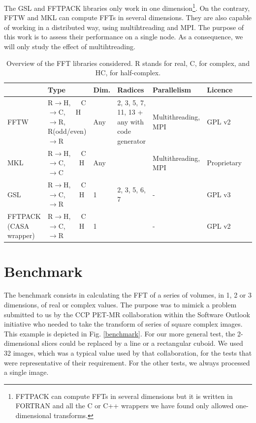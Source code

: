 \documentclass[12pt, a4paper]{article}
\begin{document}
The GSL and FFTPACK libraries only work in one dimension\footnote{FFTPACK can compute FFTs in several dimensions but it is written in FORTRAN and all the C or C++ wrappers we have found only allowed one-dimensional transforms.}. On the contrary, FFTW and MKL can compute FFTs in several dimensions. They are also capable of working in a distributed way, using multihtreading and MPI. The purpose of this work is to assess their performance on a single node. As a consequence, we will only study the effect of multihtreading. 
\begin{table}[H]
\captionsetup{width=1\textwidth}
\begin{tabular}{|p{2.5cm}||p{2.5cm}|p{1cm}|p{3cm}|p{3cm}|p{2cm}|p{2cm}|}
\hline
& Type & Dim. & Radices & Parallelism & Licence \\
\hline
\hline
FFTW & R$\to$H,\ \ \  C$\to$C,\ \ \  H$\to$R, R{\scriptsize (odd/even)}$\to$R& Any&2, 3, 5, 7, 11, 13 + any with code generator & Multithreading, MPI & GPL v2\\
\hline
MKL  &  R$\to$H,\ \ \  C$\to$C,\ \ \ \  H$\to$C& Any & & Multithreading, MPI & Proprietary\\
\hline
GSL  &  R$\to$H,\ \ \  C$\to$C,\ \ \ \  H$\to$R & 1 & 2, 3, 5, 6, 7 & - & GPL v3\\
\hline
FFTPACK {\scriptsize (CASA wrapper)} &  R$\to$H,\ \ \  C$\to$C,\ \ \ \  H$\to$R & 1 & & - & GPL v2\\
\hline
\end{tabular}
\caption{Overview of the FFT libraries considered. R stands for real, C, for complex, and HC, for half-complex.}
\label{ffttable}
\end{table}
\section{Benchmark}
The benchmark \cite{code} consists in calculating the FFT of a series of volumes, in 1, 2 or 3 dimensions, of real or complex values. The purpose was to mimick a problem submitted to us by the CCP PET-MR collaboration \cite{ccppetmr} within the Software Outlook initiative \cite{softwareoutlook} who needed to take the transform of series of square complex images. This example is depicted in Fig. \ref{benchmark}. For our more general test, the 2-dimensional slices could be replaced by a line or a rectangular cuboid. We used 32 images, which was a typical value used by that collaboration, for the tests that were representative of their requirement. For the other tests, we always processed a single image.\\
\end{document}
